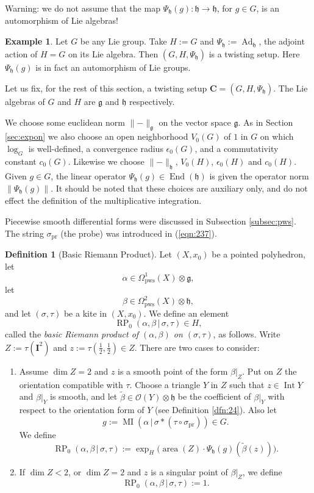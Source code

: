 \documentclass[10pt, a4paper]{amsart}
\theoremstyle{definition}
\newtheorem{dfn}[equation]{Definition}
\newtheorem{exa}[equation]{Example}
\numberwithin{equation}{section}
\newcommand{\opn}{\operatorname}
\newcommand{\mfrak}[1]{\mathfrak{#1}}
\newcommand{\mcal}[1]{\mathcal{#1}}
\newcommand{\mbf}[1]{\mathbf{#1}}
\newcommand{\mrm}[1]{\mathrm{#1}}
\newcommand{\smfrac}[2]{{\textstyle \frac{#1}{#2}}}
\newcommand{\til}[1]{\tilde{#1}}
\newcommand{\norm}[1]{\lVert #1 \rVert}
\renewcommand{\vert}{\, | \,}
\newcommand{\g}{\mfrak{g}}
\newcommand{\h}{\mfrak{h}}
\begin{document}
Warning: we do not assume that the map
$\Psi_{\h}(g) : \h \to \h$, for $g \in G$,
is an automorphism of Lie algebras!

\begin{exa}
Let $G$ be any Lie group. Take $H := G$ and
$\Psi_{\h} := \opn{Ad}_{\h}$, the adjoint action of $H = G$ on its Lie algebra.
Then $(G, H, \Psi_{\h})$ is a twisting setup. Here $\Psi_{\h}(g)$ is in
fact an automorphism of Lie groups.
\end{exa}

Let us fix, for the rest of this section, a twisting setup
$\mbf{C} = (G, H, \Psi_{\h})$. 
The Lie algebras of $G$ and $H$ are $\g$ and $\h$ respectively. 

We choose some euclidean norm $\norm{-}_{\g}$ on the vector space $\g$.
As in Section \ref{sec:expon} we also choose an open neighborhood $V_0(G)$ of
$1$ in $G$ on which $\log_G$ is well-defined, a convergence radius
$\epsilon_0(G)$, and a commutativity constant $c_0(G)$. Likewise we choose
$\norm{-}_{\h}$, $V_0(H)$, $\epsilon_0(H)$ and $c_0(H)$.
Given $g \in G$, the linear operator $\Psi_{\h}(g) \in \opn{End}(\h)$ is given
the operator norm $\norm{\Psi_{\h}(g)}$.
It should be noted that these choices are auxiliary only, and do not effect
the definition of the multiplicative integration.

Piecewise smooth differential forms were discussed in Subsection
\ref{subsec:pws}. The string $\sigma_{\mrm{pr}}$ (the probe) was introduced in 
(\ref{eqn:237}).

\begin{dfn}[Basic Riemann Product] \label{dfn:11}
Let $(X, x_0)$ be a pointed polyhedron, let
\[ \alpha \in \Omega^1_{\mrm{pws}}(X) \otimes \g , \] 
let
\[ \beta \in \Omega^2_{\mrm{pws}}(X) \otimes \h ,  \]
and let $(\sigma, \tau)$ be a kite in $(X, x_0)$.
We define an element
\[ \opn{RP}_0(\alpha, \beta \vert \sigma, \tau) \in H , \]
called the {\em basic Riemann product of $(\alpha, \beta)$ on 
$(\sigma, \tau)$}, as follows. Write
$Z := \tau(\mbf{I}^2)$ and $z := \tau(\smfrac{1}{2}, \smfrac{1}{2}) \in Z$. 
There are two cases to consider:
\begin{enumerate}
\item Assume $\opn{dim} Z = 2$ and $z$ is a smooth point of the form 
$\beta|_Z$. Put on $Z$ the orientation compatible with $\tau$. 
Choose a triangle $Y$ in $Z$ such that $z \in \opn{Int} Y$ and 
$\beta|_Y$ is smooth, and let 
$\til{\beta} \in \mcal{O}(Y) \otimes \h$
be the coefficient of $\beta|_Y$ with respect to the orientation form of $Y$
(see Definition \ref{dfn:24}). Also let 
\[ g := \opn{MI}(\alpha \vert \sigma * (\tau \circ \sigma_{\mrm{pr}})) \in G .
\]
We define
\[ \opn{RP}_0(\alpha, \beta \vert \sigma, \tau) := 
\exp_H \bigl( \opn{area}(Z) \cdot \Psi_{\h}(g)(\til{\beta}(z)) \bigr)  . \]

\item If $\opn{dim} Z < 2$, or $\opn{dim} Z = 2$ and $z$ is a singular point of
$\beta|_Z$, we define
\[ \opn{RP}_0(\alpha, \beta \vert \sigma, \tau) := 1   . \]
\end{enumerate}
\end{dfn}
\end{document}
